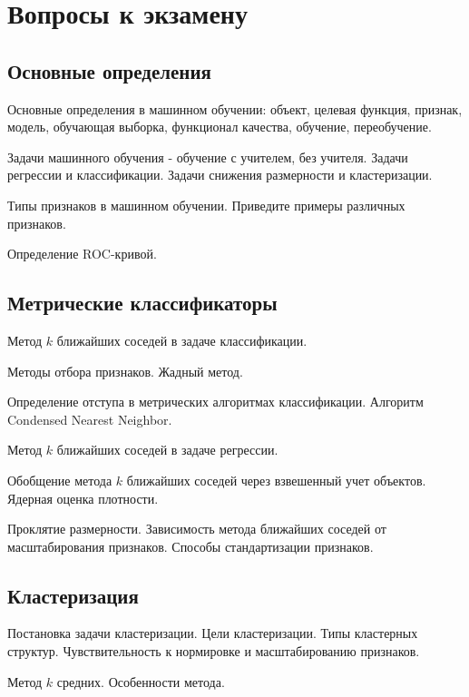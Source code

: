 \documentclass[a4paper,12pt]{article}
\begin{document}
  \section*{Вопросы к экзамену}
  
  \subsection*{Основные определения}  
  
  \myparagraph Основные определения в машинном обучении: объект, целевая функция, признак, модель, обучающая выборка, функционал качества, обучение, переобучение. 

  \myparagraph Задачи машинного обучения - обучение с учителем, без учителя. Задачи регрессии и классификации. Задачи снижения размерности и кластеризации. 

  \myparagraph Типы признаков в машинном обучении. Приведите примеры различных признаков.
  
  \myparagraph Определение ROC-кривой.
  
  \subsection*{Метрические классификаторы}  
  
  \myparagraph Метод $k$ ближайших соседей в задаче классификации. 

  \myparagraph Методы отбора признаков. Жадный метод.  

  \myparagraph Определение отступа в метрических алгоритмах классификации. Алгоритм Condensed Nearest Neighbor. 
  
  \myparagraph Метод $k$ ближайших соседей в задаче регрессии.
  
  \myparagraph Обобщение метода $k$ ближайших соседей через взвешенный учет объектов. Ядерная оценка плотности.
  
  \myparagraph Проклятие размерности. Зависимость метода ближайших соседей от масштабирования признаков. Способы стандартизации признаков.
  
  \subsection*{Кластеризация}  
  
  \myparagraph Постановка задачи кластеризации. Цели кластеризации. Типы кластерных структур. Чувствительность к нормировке и масштабированию признаков.
  
  \myparagraph Метод $k$ средних. Особенности метода. 
  
\end{document}
